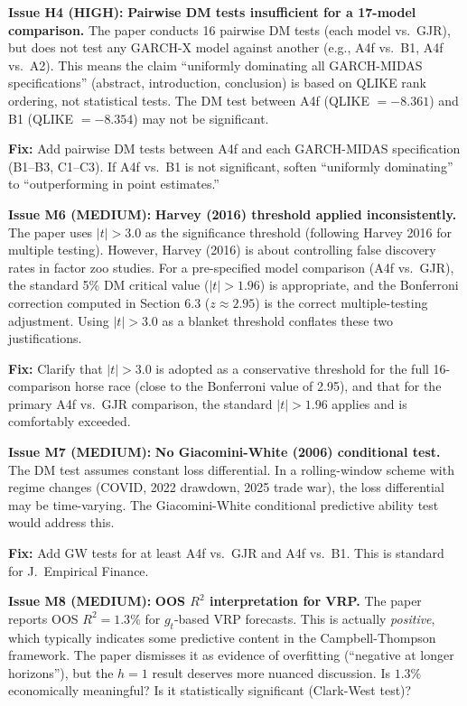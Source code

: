 \documentclass[12pt,a4paper]{article}
\begin{document}
\bigskip

\textcolor{errorred}{\textbf{Issue H4 (HIGH):}} \textbf{Pairwise DM tests insufficient for a 17-model comparison.} The paper conducts 16 pairwise DM tests (each model vs.\ GJR), but does not test any GARCH-X model against another (e.g., A4f vs.\ B1, A4f vs.\ A2). This means the claim ``uniformly dominating all GARCH-MIDAS specifications'' (abstract, introduction, conclusion) is based on QLIKE rank ordering, not statistical tests. The DM test between A4f (QLIKE $= -8.361$) and B1 (QLIKE $= -8.354$) may not be significant.

\textbf{Fix:} Add pairwise DM tests between A4f and each GARCH-MIDAS specification (B1--B3, C1--C3). If A4f vs.\ B1 is not significant, soften ``uniformly dominating'' to ``outperforming in point estimates.''

\bigskip

\textcolor{warncolor}{\textbf{Issue M6 (MEDIUM):}} \textbf{Harvey (2016) threshold applied inconsistently.} The paper uses $|t| > 3.0$ as the significance threshold (following Harvey 2016 for multiple testing). However, Harvey (2016) is about controlling false discovery rates in factor zoo studies. For a pre-specified model comparison (A4f vs.\ GJR), the standard 5\% DM critical value ($|t| > 1.96$) is appropriate, and the Bonferroni correction computed in Section 6.3 ($z \approx 2.95$) is the correct multiple-testing adjustment. Using $|t| > 3.0$ as a blanket threshold conflates these two justifications.

\textbf{Fix:} Clarify that $|t| > 3.0$ is adopted as a conservative threshold for the full 16-comparison horse race (close to the Bonferroni value of 2.95), and that for the primary A4f vs.\ GJR comparison, the standard $|t| > 1.96$ applies and is comfortably exceeded.

\bigskip

\textcolor{warncolor}{\textbf{Issue M7 (MEDIUM):}} \textbf{No Giacomini-White (2006) conditional test.} The DM test assumes constant loss differential. In a rolling-window scheme with regime changes (COVID, 2022 drawdown, 2025 trade war), the loss differential may be time-varying. The Giacomini-White conditional predictive ability test would address this.

\textbf{Fix:} Add GW tests for at least A4f vs.\ GJR and A4f vs.\ B1. This is standard for J.\ Empirical Finance.

\bigskip

\textcolor{warncolor}{\textbf{Issue M8 (MEDIUM):}} \textbf{OOS $R^2$ interpretation for VRP.} The paper reports OOS $R^2 = 1.3\%$ for $g_t$-based VRP forecasts. This is actually \emph{positive}, which typically indicates some predictive content in the Campbell-Thompson framework. The paper dismisses it as evidence of overfitting (``negative at longer horizons''), but the $h=1$ result deserves more nuanced discussion. Is $1.3\%$ economically meaningful? Is it statistically significant (Clark-West test)?
\end{document}
